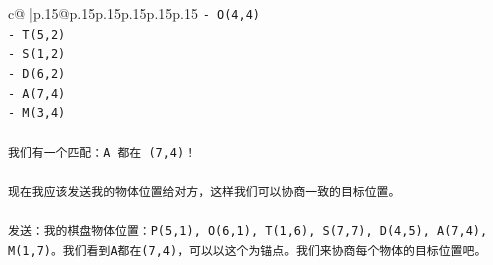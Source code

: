 \documentclass{article}
\begin{document}
{\begin{supertabular}{c@{$\;$}|p{.15\linewidth}@{}p{.15\linewidth}p{.15\linewidth}p{.15\linewidth}p{.15\linewidth}p{.15\linewidth}}
{{{\texttt{{-} O(4,4)} \\
\texttt{{-} T(5,2)} \\
\texttt{{-} S(1,2)} \\
\texttt{{-} D(6,2)} \\
\texttt{{-} A(7,4)} \\
\texttt{{-} M(3,4)} \\
\\ 
\texttt{我们有一个匹配：A 都在 (7,4)！} \\
\\ 
\texttt{现在我应该发送我的物体位置给对方，这样我们可以协商一致的目标位置。} \\
\\ 
\texttt{发送：我的棋盘物体位置：P(5,1), O(6,1), T(1,6), S(7,7), D(4,5), A(7,4), M(1,7)。我们看到A都在(7,4)，可以以这个为锚点。我们来协商每个物体的目标位置吧。} \\
            }
        }
    }
     \\ \\


\end{supertabular}}
\end{document}
